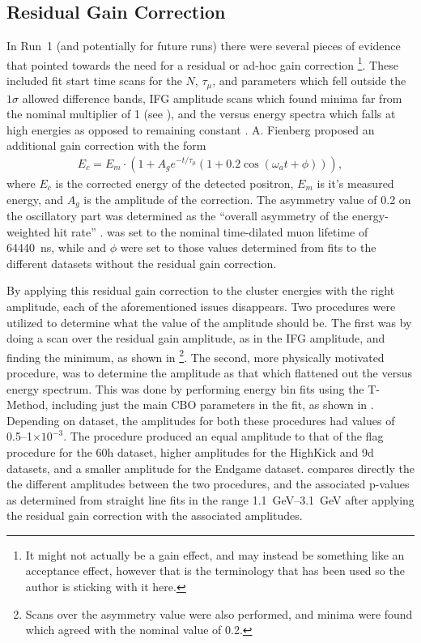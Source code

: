 \subsection{Residual Gain Correction}
\label{sub:residual_gain_correction}


In Run~1 (and potentially for future runs) there were several pieces of evidence that pointed towards the need for a residual or ad-hoc gain correction \footnote{It might not actually be a gain effect, and may instead be something like an acceptance effect, however that is the terminology that has been used so the author is sticking with it here.}. These included fit start time scans for the $N$, $\tau_{\mu}$, and \K parameters which fell outside the $1\sigma$ allowed difference bands, IFG amplitude scans which found minima far from the nominal multiplier of 1 (see ), and the \K versus energy spectra which falls at high energies as opposed to remaining constant \cite{phdthesis:2020Sweigart,phdthesis:2019Fienberg,AdHoc1,AdHoc2}. A. Fienberg proposed an additional gain correction with the form
\begin{align}
  E_{c} = E_{m} \cdot (1 + A_{g} e^{-t/\tau_{\mu}} (1 + 0.2 \cos(\omega_{a}t + \phi))),
\end{align}
where $E_{c}$ is the corrected energy of the detected positron, $E_{m}$ is it's measured energy, and $A_{g}$ is the amplitude of the correction. The asymmetry value of 0.2 on the oscillatory part was determined as the ``overall asymmetry of the energy-weighted hit rate'' \cite{phdthesis:2019Fienberg}. \taumu was set to the nominal time-dilated muon lifetime of \SI{64440}{}~ns, while \wa and $\phi$ were set to those values determined from fits to the different datasets without the residual gain correction.


By applying this residual gain correction to the cluster energies with the right amplitude, each of the aforementioned issues disappears. Two procedures were utilized to determine what the value of the amplitude should be. The first was by doing a scan over the residual gain amplitude, as in the IFG amplitude, and finding the minimum, as shown in \footnote{Scans over the asymmetry value were also performed, and minima were found which agreed with the nominal value of 0.2.}. The second, more physically motivated procedure, was to determine the amplitude as that which flattened out the \K versus energy spectrum. This was done by performing energy bin fits using the T-Method, including just the main CBO parameters in the fit, as shown in . Depending on dataset, the amplitudes for both these procedures had values of 0.5--1$\times 10^{-3}$. The \chisq procedure produced an equal amplitude to that of the flag \K procedure for the 60h dataset, higher amplitudes for the HighKick and 9d datasets, and a smaller amplitude for the Endgame dataset.  compares directly the the different amplitudes between the two procedures, and the associated p-values as determined from straight line fits in the range \SIrange{1.1}{3.1}{\GeV} after applying the residual gain correction with the associated amplitudes. 


